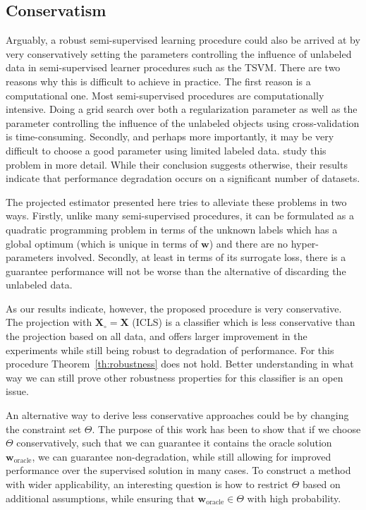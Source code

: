 \documentclass[smallcondensed]{svjour3}\usepackage[]{graphicx}\usepackage[]{color}
\renewcommand{\vec}[1]{\mathbf{#1}}
\begin{document}
\subsection{Conservatism}
Arguably, a robust semi-supervised learning procedure could also be arrived at by very conservatively setting the parameters controlling the influence of unlabeled data in semi-supervised learner procedures such as the TSVM. There are two reasons why this is difficult to achieve in practice. The first reason is a computational one. Most semi-supervised procedures are computationally intensive. Doing a grid search over both a regularization parameter as well as the parameter controlling the influence of the unlabeled objects using cross-validation is time-consuming. Secondly, and perhaps more importantly, it may be very difficult to choose a good parameter using limited labeled data. \citet{Goldberg2009} study this problem in more detail. While their conclusion suggests otherwise, their results indicate that performance degradation occurs on a significant number of datasets. 

The projected estimator presented here tries to alleviate these problems in two ways. Firstly, unlike many semi-supervised procedures, it can be formulated as a quadratic programming problem in terms of the unknown labels which has a global optimum (which is unique in terms of $\vec{w}$) and there are no hyper-parameters involved. Secondly, at least in terms of its surrogate loss, there is a guarantee performance will not be worse than the alternative of discarding the unlabeled data. 

As our results indicate, however, the proposed procedure is very conservative. The projection with $\mathbf{X}_\circ = \mathbf{X}$ (ICLS) is a classifier which is less conservative than the projection based on all data, and offers larger improvement in the experiments while still being robust to degradation of performance. For this procedure Theorem~\ref{th:robustness} does not hold.  Better understanding in what way we can still prove other robustness properties for this classifier is an open issue.

An alternative way to derive less conservative approaches could be by changing the constraint set $\Theta$. The purpose of this work has been to show that if we choose $\Theta$ conservatively, such that we can guarantee it contains the oracle solution $\vec{w}_\text{oracle}$, we can guarantee non-degradation, while still allowing for improved performance over the supervised solution in many cases. To construct a method with wider applicability, an interesting question is how to restrict $\Theta$ based on additional assumptions, while ensuring that $\vec{w}_\text{oracle} \in \Theta$ with high probability.
\end{document}
